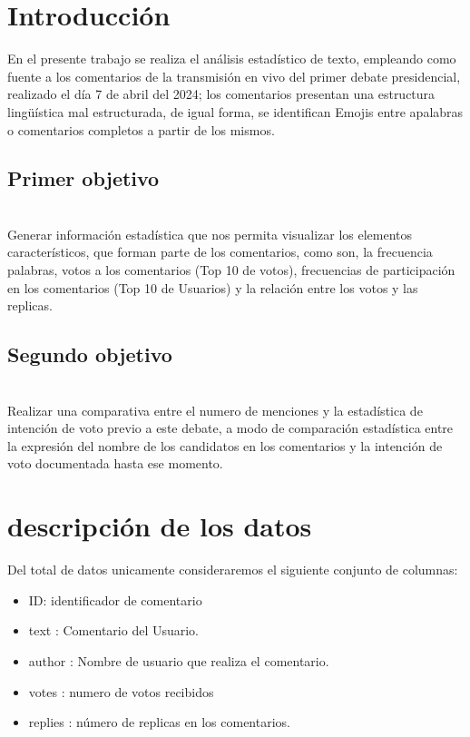 \chapter{Introducción}

En el presente trabajo se realiza el análisis estadístico de texto, empleando como fuente a los comentarios de la transmisión en vivo del primer debate presidencial, realizado el día 7 de abril del 2024; los comentarios presentan una estructura lingüística mal estructurada, de igual forma, se identifican Emojis entre apalabras o comentarios completos a partir de los mismos.\\


\section{Primer objetivo}\\
 Generar información estadística que nos permita visualizar los elementos característicos, que forman parte de los comentarios, como son, la frecuencia palabras, votos a los comentarios (Top 10 de votos), frecuencias de participación en los comentarios (Top 10 de Usuarios) y la relación entre los votos y las replicas.\\

\section{Segundo objetivo}\\
 Realizar una comparativa entre el numero de menciones y la estadística de intención de voto previo a este debate, a modo de comparación estadística entre la expresión del nombre de los candidatos en los comentarios y la intención de voto documentada hasta ese momento.\\
   


\chapter{descripción de los datos}

Del total de datos unicamente consideraremos el siguiente conjunto de columnas:\\

\begin{itemize}
	\item ID: identificador de comentario
	\item text : Comentario del Usuario.
	\item author : Nombre de usuario que realiza el comentario.
	\item votes : numero de votos recibidos 
	\item replies : número de replicas en los comentarios.\\
\end{itemize} 

